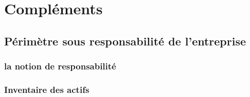 
\section{Compléments}
\subsection{Périmètre sous responsabilité de l’entreprise}

\subsubsection{la notion de responsabilité}


\subsubsection{Inventaire des actifs}
%
